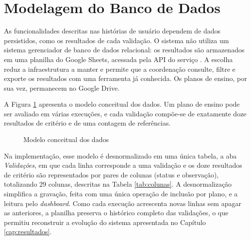 \section{Modelagem do Banco de Dados}
\label{sec:bd}

As funcionalidades descritas nas histórias de usuário dependem de dados persistidos, como os resultados de cada validação. O sistema não utiliza um sistema gerenciador de banco de dados relacional: os resultados são armazenados em uma planilha do Google Sheets, acessada pela API do serviço \cite{GoogleSheetsAPI}. A escolha reduz a infraestrutura a manter e permite que a coordenação consulte, filtre e exporte os resultados com uma ferramenta já conhecida. Os planos de ensino, por sua vez, permanecem no Google Drive.

A Figura \ref{fig:dados} apresenta o modelo conceitual dos dados. Um plano de ensino pode ser avaliado em várias execuções, e cada validação compõe-se de exatamente doze resultados de critério e de uma contagem de referências.

\begin{figure}[htbp]
\centering
\caption{Modelo conceitual dos dados}
\label{fig:dados}

\end{figure}

Na implementação, esse modelo é desnormalizado em uma única tabela, a aba \textit{Validações}, em que cada linha corresponde a uma validação e os doze resultados de critério são representados por pares de colunas (status e observação), totalizando 29 colunas, descritas na Tabela \ref{tab:colunas}. A desnormalização simplifica a gravação, feita com uma única operação de inclusão por plano, e a leitura pelo \textit{dashboard}. Como cada execução acrescenta novas linhas sem apagar as anteriores, a planilha preserva o histórico completo das validações, o que permitiu reconstruir a evolução do sistema apresentada no Capítulo \ref{cap:resultados}.

